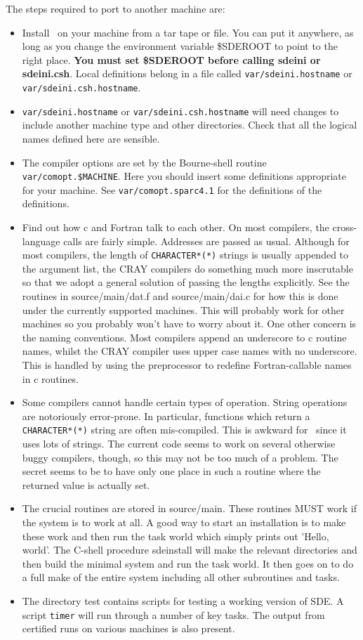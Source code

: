 The steps required to port to another machine are:
\begin{itemize}
\item Install \sde\ on your machine from a tar tape or file. You can put
it anywhere, as long as you change the environment variable \$SDEROOT
to point to the right place. {\bf You must set \$SDEROOT before
calling sdeini or sdeini.csh}. Local definitions belong in a file
called {\tt var/sdeini.hostname} or {\tt var/sdeini.csh.hostname}.
\item {\tt var/sdeini.hostname} or {\tt var/sdeini.csh.hostname} 
will need changes to include another machine type and other
directories. Check that all the logical names defined here are
sensible.
\item The compiler options are set by the Bourne-shell routine 
{\tt var/comopt.\$MACHINE}. Here you should insert some definitions
appropriate for your machine. See {\tt var/comopt.sparc4.1} for the definitions
of the definitions.
\item Find out how c and Fortran talk to each other. On most compilers, the
cross-language calls are fairly simple. Addresses are passed as usual.
Although for most compilers, the length of {\tt CHARACTER*(*)} strings
is usually appended to the argument list, the CRAY compilers do
something much more inscrutable so that we adopt a general solution of
passing the lengths explicitly.  See the routines in source/main/dat.f
and source/main/dai.c for how this is done under the currently
supported machines. This will probably work for other machines so you
probably won't have to worry about it. One other concern is the naming
conventions. Most compilers append an underscore to c routine names,
whilst the CRAY compiler uses upper case names with no underscore.
This is handled by using the preprocessor to redefine Fortran-callable
names in c routines.
\item Some compilers cannot handle certain types of operation. String
operations are notoriously error-prone. In particular, 
functions which return a 
{\tt CHARACTER*(*)} string are often mis-compiled. This is awkward for
\sde\ since it uses lots of strings. The current code seems to work on 
several otherwise buggy compilers, though, so this may not be too much of
a problem. The secret seems to be to have only one place in such a routine
where the returned value is actually set.
\item The crucial routines are stored in source/main. These routines MUST
work if the system is to work at all. A good way to start an installation is
to make these work and then run the task world which simply prints out
'Hello, world'. The C-shell procedure sdeinstall will make the relevant
directories and then build the minimal system
and run the task world. It then goes on to do a full make of the entire 
system including all other subroutines and tasks.
\item The directory test contains scripts for testing a working version of 
SDE. A script {\tt timer} will run through a number of key tasks.
The output from certified runs on various machines is also present. 

\end{itemize}

